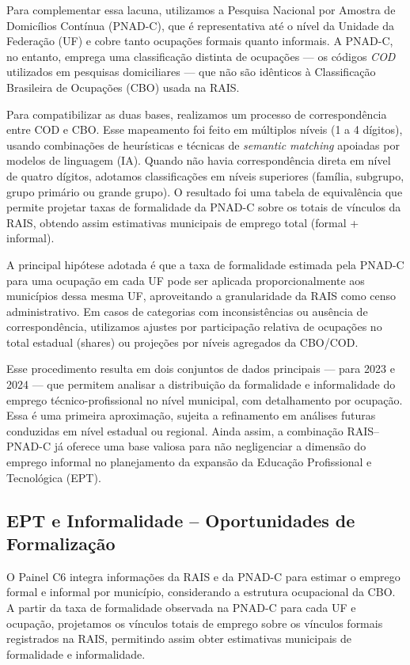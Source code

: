 Para complementar essa lacuna, utilizamos a Pesquisa Nacional por Amostra de Domicílios Contínua (PNAD-C), que é representativa até o nível da Unidade da Federação (UF) e cobre tanto ocupações formais quanto informais. A PNAD-C, no entanto, emprega uma classificação distinta de ocupações — os códigos \textit{COD} utilizados em pesquisas domiciliares — que não são idênticos à Classificação Brasileira de Ocupações (CBO) usada na RAIS.

Para compatibilizar as duas bases, realizamos um processo de correspondência entre COD e CBO. Esse mapeamento foi feito em múltiplos níveis (1 a 4 dígitos), usando combinações de heurísticas e técnicas de \textit{semantic matching} apoiadas por modelos de linguagem (IA). Quando não havia correspondência direta em nível de quatro dígitos, adotamos classificações em níveis superiores (família, subgrupo, grupo primário ou grande grupo). O resultado foi uma tabela de equivalência que permite projetar taxas de formalidade da PNAD-C sobre os totais de vínculos da RAIS, obtendo assim estimativas municipais de emprego total (formal + informal).

A principal hipótese adotada é que a taxa de formalidade estimada pela PNAD-C para uma ocupação em cada UF pode ser aplicada proporcionalmente aos municípios dessa mesma UF, aproveitando a granularidade da RAIS como censo administrativo. Em casos de categorias com inconsistências ou ausência de correspondência, utilizamos ajustes por participação relativa de ocupações no total estadual (shares) ou projeções por níveis agregados da CBO/COD.

Esse procedimento resulta em dois conjuntos de dados principais — para 2023 e 2024 — que permitem analisar a distribuição da formalidade e informalidade do emprego técnico-profissional no nível municipal, com detalhamento por ocupação. Essa é uma primeira aproximação, sujeita a refinamento em análises futuras conduzidas em nível estadual ou regional. Ainda assim, a combinação RAIS–PNAD-C já oferece uma base valiosa para não negligenciar a dimensão do emprego informal no planejamento da expansão da Educação Profissional e Tecnológica (EPT).

\subsection{EPT e Informalidade – Oportunidades de Formalização}

O Painel C6 integra informações da RAIS e da PNAD-C para estimar o emprego formal e informal por município, considerando a estrutura ocupacional da CBO. A partir da taxa de formalidade observada na PNAD-C para cada UF e ocupação, projetamos os vínculos totais de emprego sobre os vínculos formais registrados na RAIS, permitindo assim obter estimativas municipais de formalidade e informalidade.  

